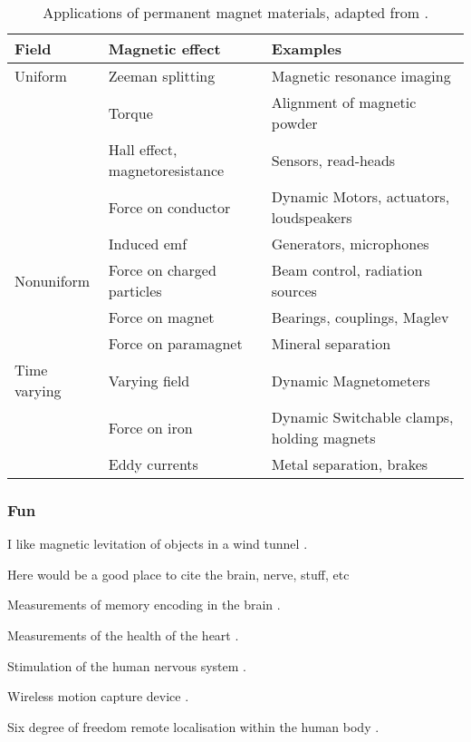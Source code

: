 \begin{table}
\begin{wide}
\begin{tabular}{@{}lll@{}}
\toprule
Field & Magnetic effect & Examples \\
\midrule
Uniform & Zeeman splitting & Magnetic resonance imaging \\
& Torque & Alignment of magnetic powder \\
& Hall effect, magnetoresistance & Sensors, read-heads \\
& Force on conductor & Dynamic Motors, actuators, loudspeakers \\
& Induced emf & Generators, microphones \\
Nonuniform & Force on charged particles & Beam control, 
radiation sources %
\\
& Force on magnet & Bearings, couplings, Maglev \\
& Force on paramagnet & Mineral separation \\
Time varying & Varying field & Dynamic Magnetometers \\
& Force on iron & Dynamic Switchable clamps, holding magnets \\
& Eddy currents & Metal separation, brakes \\
\bottomrule
\end{tabular}
\end{wide}
\caption{Applications of permanent magnet materials, 
adapted from \textcite{coey2002}.}
\end{table}

\subsubsection{Fun}


I like magnetic levitation of objects in a wind tunnel \cite{higuchi2008}.

Here would be a good place to cite the brain, nerve, stuff, etc
\parencite{sekino2005,lu2008,demachi2008}

Measurements of memory encoding in the brain \cite{gjini2005}.

Measurements of the health of the heart \cite{lim2009}.

Stimulation of the human nervous system \cite{darabant2009}.

Wireless motion capture device \cite{hashi2005}.

Six degree of freedom remote localisation within the human body \cite{yang2009-ietm}.

